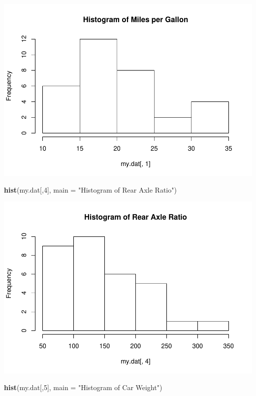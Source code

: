 \documentclass[
]{article}
\newenvironment{Shaded}{\begin{snugshade}}{\end{snugshade}}
\newcommand{\DataTypeTok}[1]{\textcolor[rgb]{0.13,0.29,0.53}{#1}}
\newcommand{\DecValTok}[1]{\textcolor[rgb]{0.00,0.00,0.81}{#1}}
\newcommand{\KeywordTok}[1]{\textcolor[rgb]{0.13,0.29,0.53}{\textbf{#1}}}
\newcommand{\NormalTok}[1]{#1}
\newcommand{\StringTok}[1]{\textcolor[rgb]{0.31,0.60,0.02}{#1}}
\begin{document}
\includegraphics{CA2_DataAnalysis_files/figure-latex/unnamed-chunk-15-1.pdf}

\begin{Shaded}
\begin{Highlighting}[]
\KeywordTok{hist}\NormalTok{(my.dat[,}\DecValTok{4}\NormalTok{], }\DataTypeTok{main =} \StringTok{"Histogram of Rear Axle Ratio"}\NormalTok{)}
\end{Highlighting}
\end{Shaded}

\includegraphics{CA2_DataAnalysis_files/figure-latex/unnamed-chunk-15-2.pdf}

\begin{Shaded}
\begin{Highlighting}[]
\KeywordTok{hist}\NormalTok{(my.dat[,}\DecValTok{5}\NormalTok{], }\DataTypeTok{main =} \StringTok{"Histogram of Car Weight"}\NormalTok{)}
\end{Highlighting}
\end{Shaded}
\end{document}
